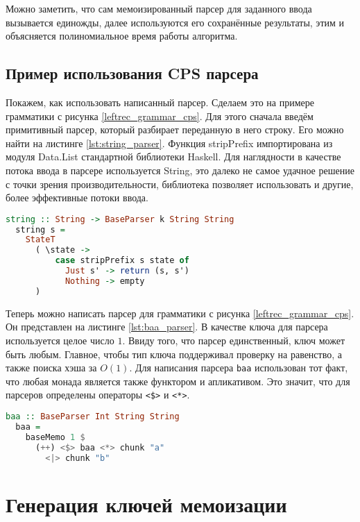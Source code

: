 \documentclass[times]{itmo-student-thesis}
\begin{document}
Можно заметить, что сам мемоизированный парсер для заданного ввода вызывается единожды, далее используются его
сохранённые результаты, этим и объясняется полиномиальное время работы алгоритма.

\subsection{Пример использования CPS парсера}\label{sec:cps_parser_example}

Покажем, как использовать написанный парсер. Сделаем это на примере грамматики с рисунка \ref{leftrec_grammar_cps}.
Для этого сначала введём примитивный парсер, который разбирает переданную в него строку. Его можно найти на листинге
\ref{lst:string_parser}. Функция stripPrefix импортирована из модуля Data.List стандартной библиотеки Haskell. Для
наглядности в качестве потока ввода в парсере используется String,  это далеко не самое удачное решение с точки зрения
производительности, библиотека позволяет использовать и другие, более эффективные потоки ввода.

\begin{lstlisting}[language=Haskell,float=!h,caption={Парсер для строки},label={lst:string_parser}]
  string :: String -> BaseParser k String String
  string s =
    StateT
      ( \state ->
          case stripPrefix s state of
            Just s' -> return (s, s')
            Nothing -> empty
      )
\end{lstlisting}

Теперь можно написать парсер для грамматики с рисунка \ref{leftrec_grammar_cps}. Он представлен на листинге
\ref{lst:baa_parser}.	В качестве ключа для парсера используется целое число $1$. Ввиду того, что
парсер единственный, ключ может быть любым. Главное, чтобы тип ключа поддерживал проверку на равенство, а также поиска
хэша за $O(1)$. Для написания парсера \lstinline{baa} использован тот факт, что любая монада
является также функтором и апликативом. Это значит, что для парсеров определены операторы
\lstinline{<$>} и \lstinline{<*>}.

\begin{lstlisting}[language=Haskell,float=!h,caption={Парсер для строк $ba^*$},label={lst:baa_parser}]
  baa :: BaseParser Int String String
  baa =
    baseMemo 1 $
      (++) <$> baa <*> chunk "a"
        <|> chunk "b"
\end{lstlisting}

\section{Генерация ключей мемоизации}\label{sec:memoization_keys}
\end{document}
